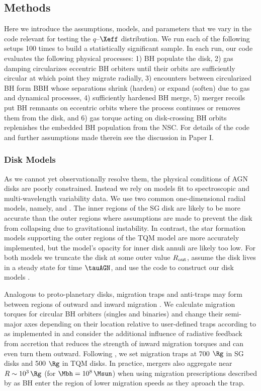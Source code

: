 \subsection{Methods}
\label{sec:methods-ch2}
Here we introduce the assumptions, models, and parameters that we vary in the  code relevant for testing the $q$--$\Xeff$ distribution.
We run each of the following setups 100 times to build a statistically significant sample.
In each run, our code evaluates the following physical processes: 1) BH populate the disk, 2) gas damping circularizes eccentric BH orbiters until their orbits are sufficiently circular at which point they migrate radially, 3) encounters between circularized BH form BBH whose separations shrink (harden) or expand (soften) due to gas and dynamical processes, 4) sufficiently hardened BH merge, 5) merger recoils put BH remnants on eccentric orbits where the process continues or removes them from the disk, and 6) gas torque acting on disk-crossing BH orbits replenishes the embedded BH population from the NSC.
For details of the code and further assumptions made therein see the discussion in Paper I.

\subsubsection{Disk Models}
As we cannot yet observationally resolve them, the physical conditions of AGN disks are poorly constrained.
Instead we rely on models fit to spectroscopic and multi-wavelength variability data.
We use two common one-dimensional radial models, namely, \citet[][hereafter SG]{SirkoGoodman03} and \citet[][hereafter TQM]{ThompsonQuataertMurray05}.
The inner regions of the SG disk are likely to be more accurate than the outer regions where assumptions are made to prevent the disk from collapsing due to gravitational instability.
In contrast, the star formation models supporting the outer regions of the TQM model are more accurately implemented, but the model's opacity for inner disk annuli are likely too low.
For both models we truncate the disk at some outer value $R_{\rm out}$, assume the disk lives in a steady state for time $\tauAGN$, and use the  code to construct our disk models \citep{Gangardt+24-pAGN}.

Analogous to proto-planetary disks, migration traps and anti-traps may form between regions of outward and inward migration \citep{Lyra+10}.
We calculate migration torques for circular BH orbiters (singles and binaries) and change their semi-major axes depending on their location relative to user-defined traps according to \citet{Paardekooper+10} as implemented in \citet{GrishinGilbaumStone24} and consider the additional influence of radiative feedback from accretion \citep{HanklaJiangArmitage20} that reduces the strength of inward migration torques and can even turn them outward.
Following \citet{Bellovary+16}, we set migration traps at 700 $\Rg$ in SG disks and 500 $\Rg$ in TQM disks.
In practice, mergers also aggregate near $R\sim10^3\,\Rg$ (for $\Mbh = 10^8\,\Msun$) when using migration prescriptions described by \citet{GrishinGilbaumStone24} as BH enter the region of lower migration speeds as they aproach the trap.

